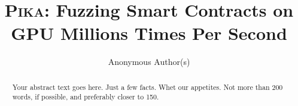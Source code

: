 \documentclass[conference,compsoc]{IEEEtran}
\newcommand{\tool}{\textsc{Pika}}
\begin{document}
\title{\Large \bf {\tool}: Fuzzing Smart Contracts on GPU Millions Times Per Second}

\author{
{\rm Anonymous Author(s)}
} 



\maketitle

\begin{abstract}
Your abstract text goes here. Just a few facts. Whet our appetites.
Not more than 200 words, if possible, and preferably closer to 150.
\end{abstract}


   












\end{document}
